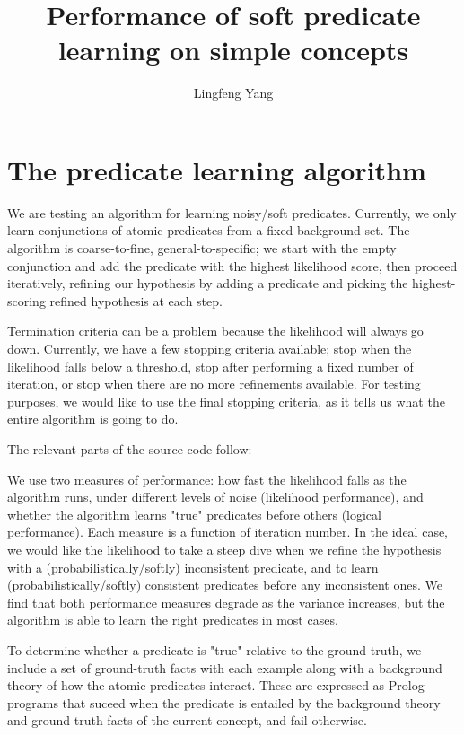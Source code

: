 \documentclass{article}
\begin{document}
\title{Performance of soft predicate learning on simple concepts}
\author{Lingfeng Yang}
\maketitle

\section{The predicate learning algorithm}

We are testing an algorithm for learning noisy/soft predicates. Currently, we
only learn conjunctions of atomic predicates from a fixed background set. The
algorithm is coarse-to-fine, general-to-specific; we start with the empty
conjunction and add the predicate with the highest likelihood score, then
proceed iteratively, refining our hypothesis by adding a predicate and picking
the highest-scoring refined hypothesis at each step.

Termination criteria can be a problem because the likelihood will always go
down. Currently, we have a few stopping criteria available; stop when the
likelihood falls below a threshold, stop after performing a fixed number of
iteration, or stop when there are no more refinements available. For testing
purposes, we would like to use the final stopping criteria, as it tells us what
the entire algorithm is going to do. 

The relevant parts of the source code follow:

\lstset{language=LISP}


We use two measures of performance: how fast the likelihood falls as the
algorithm runs, under different levels of noise (likelihood performance), and
whether the algorithm learns "true" predicates before others (logical
performance). Each measure is a function of iteration number. In the ideal
case, we would like the likelihood to take a steep dive when we refine the
hypothesis with a (probabilistically/softly) inconsistent predicate, and to
learn (probabilistically/softly) consistent predicates before any inconsistent
ones. We find that both performance measures degrade as the variance increases,
but the algorithm is able to learn the right predicates in most cases.

To determine whether a predicate is "true" relative to the ground truth, we
include a set of ground-truth facts with each example along with a background
theory of how the atomic predicates interact. These are expressed as Prolog
programs that suceed when the predicate is entailed by the background theory
and ground-truth facts of the current concept, and fail otherwise.
\end{document}
